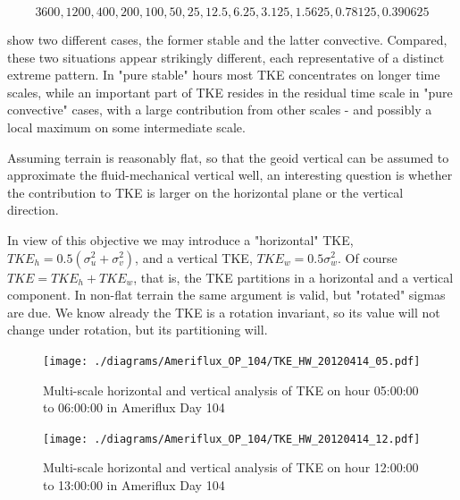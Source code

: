 \documentclass[a4paper,10pt]{book}
\begin{document}
\begin{equation}\label{eq:Scale sequence for TKE}
	3600, 1200, 400, 200, 100, 50, 25, 12.5, 6.25, 3.125, 1.5625, 0.78125, 0.390625
\end{equation}

show two different cases, the former stable and the latter convective. Compared, these two situations appear strikingly different, each representative of a distinct extreme pattern. In "pure stable" hours most TKE concentrates on longer time scales, while an important part of TKE resides in the residual time scale in "pure convective" cases, with a large contribution from other scales - and possibly a local maximum on some intermediate scale.

Assuming terrain is reasonably flat, so that the geoid vertical can be assumed to approximate the fluid-mechanical vertical well, an interesting question is whether the contribution to TKE is larger on the horizontal plane or the vertical direction.

In view of this objective we may introduce a "horizontal" TKE, $TKE_{h} = 0.5 \left(\sigma_{u}^{2} + \sigma_{v}^{2}\right)$, and a vertical TKE, $TKE_{w} = 0.5 \sigma_{w}^{2}$. Of course $TKE = TKE_{h} + TKE_{w}$, that is, the TKE partitions in a horizontal and a vertical component. In non-flat terrain the same argument is valid, but "rotated" sigmas are due. We know already the TKE is a rotation invariant, so its value will not change under rotation, but its partitioning will.

\begin{figure}[htp]
 \centering
 \begin{center}
 \texttt{[image: ./diagrams/Ameriflux\_OP\_104/TKE\_HW\_20120414\_05.pdf]}
 \end{center}
 \caption{Multi-scale horizontal and vertical analysis of TKE on hour 05:00:00 to 06:00:00 in Ameriflux Day 104}
 \label{fig:Ame.104.TKE_HW.Stable}
\end{figure}

\begin{figure}[htp]
 \centering
 \begin{center}
 \texttt{[image: ./diagrams/Ameriflux\_OP\_104/TKE\_HW\_20120414\_12.pdf]}
 \end{center}
 \caption{Multi-scale horizontal and vertical analysis of TKE on hour 12:00:00 to 13:00:00 in Ameriflux Day 104}
 \label{fig:Ame.104.TKE_HW.Convective}
\end{figure}
\end{document}
